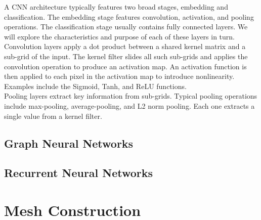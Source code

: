 A CNN architecture typically features two broad stages, embedding and classification. 
The embedding stage features convolution, activation, and pooling operations.
The classification stage usually contains fully connected layers.
We will explore the characteristics and purpose of each of these layers in turn.\\

Convolution layers apply a dot product between a shared kernel matrix and a sub-grid of the input. 
The kernel filter slides all such sub-grids and applies the convolution operation to produce an activation map.
An activation function is then applied to each pixel in the activation map to introduce nonlinearity.
Examples include the Sigmoid, Tanh, and ReLU functions.\\

Pooling layers extract key information from sub-grids. Typical pooling operations include max-pooling, average-pooling, and L2 norm pooling. Each one extracts a single value from a kernel filter.\\

\subsection{Graph Neural Networks}


\subsection{Recurrent Neural Networks}

\section{Mesh Construction}